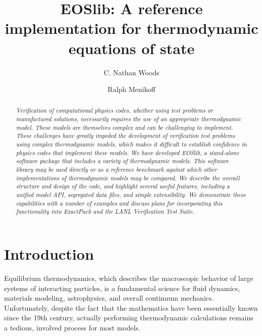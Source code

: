 \documentclass[twocolumn,10pt]{asme2ej}
\title{EOSlib: A reference implementation for thermodynamic equations of state
}
\author{C. Nathan Woods
    \affiliation{
	Postdoctoral Researcher,\\
	Verification and Analysis Group\\
	Los Alamos National Laboratory\\
	Los Alamos, NM 87545\\
    Email: woodscn@lanl.gov
    }	
}
\author{Ralph Menikoff \\
}
\begin{document}
\maketitle    

\begin{abstract}
{\it 
Verification of computational physics codes, whether using test problems or manufactured solutions, necessarily requires the use of an appropriate thermodynamic model. These models are themselves complex and can be challenging to implement. These challenges have greatly impeded the development of verification test problems using complex thermodynamic models, which makes it difficult to establish confidence in physics codes that implement these models. We have developed EOSlib, a stand-alone software package that includes a variety of thermodynamic models. This software library may be used directly or as a reference benchmark against which other implementations of thermodynamic models may be compared. We describe the overall structure and design of the code, and highlight several useful features, including a unified model API, segregated data files, and simple extensibility. We demonstrate these capabilities with a number of examples and discuss plans for incorporating this functionality into ExactPack and the LANL Verification Test Suite.
}
\end{abstract}


\section{Introduction}

Equilibrium thermodynamics, which describes the macroscopic behavior of large systems of interacting particles, is a fundamental science for fluid dynamics, materials modeling, astrophysics, and overall continuum mechanics. Unfortunately, despite the fact that the mathematics have been essentially known since the 19th century, actually performing thermodynamic calculations remains a tedious, involved process for most models. 
\end{document}
